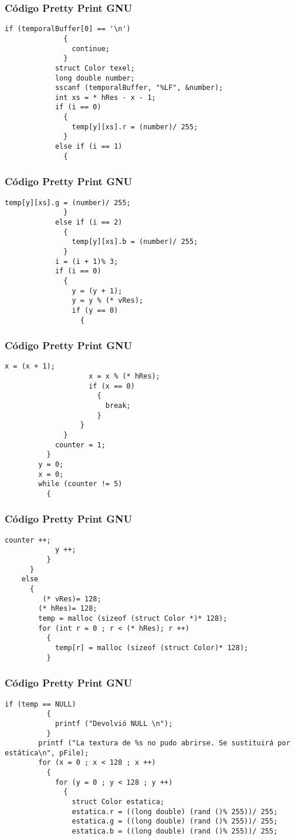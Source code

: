 \documentclass{beamer}
\begin{document}
\begin{frame}[fragile]
\frametitle{C\'odigo Pretty Print GNU}
\begin{lstlisting}[style=CStyle]
            if (temporalBuffer[0] == '\n')
              {
                continue;
              }
            struct Color texel;
            long double number;
            sscanf (temporalBuffer, "%LF", &number);
            int xs = * hRes - x - 1;
            if (i == 0)
              {
                temp[y][xs].r = (number)/ 255;
              }
            else if (i == 1)
              {
                \end{lstlisting}
\end{frame}
\begin{frame}[fragile]
\frametitle{C\'odigo Pretty Print GNU}
\begin{lstlisting}[style=CStyle]
                temp[y][xs].g = (number)/ 255;
              }
            else if (i == 2)
              {
                temp[y][xs].b = (number)/ 255;
              }
            i = (i + 1)% 3;
            if (i == 0)
              {
                y = (y + 1);
                y = y % (* vRes);
                if (y == 0)
                  {
                    \end{lstlisting}
\end{frame}
\begin{frame}[fragile]
\frametitle{C\'odigo Pretty Print GNU}
\begin{lstlisting}[style=CStyle]
                    x = (x + 1);
                    x = x % (* hRes);
                    if (x == 0)
                      {
                        break;
                      }
                  }
              }
            counter = 1;
          }
        y = 0;
        x = 0;
        while (counter != 5)
          {
            \end{lstlisting}
\end{frame}
\begin{frame}[fragile]
\frametitle{C\'odigo Pretty Print GNU}
\begin{lstlisting}[style=CStyle]
            counter ++;
            y ++;
          }
      }
    else
      {
         (* vRes)= 128;
        (* hRes)= 128;
        temp = malloc (sizeof (struct Color *)* 128);
        for (int r = 0 ; r < (* hRes); r ++)
          {
            temp[r] = malloc (sizeof (struct Color)* 128);
          }
\end{lstlisting}
\end{frame}
\begin{frame}[fragile]
\frametitle{C\'odigo Pretty Print GNU}
\begin{lstlisting}[style=CStyle]
        if (temp == NULL)
          {
            printf ("Devolvió NULL \n");
          }
        printf ("La textura de %s no pudo abrirse. Se sustituirá por estática\n", pFile);
        for (x = 0 ; x < 128 ; x ++)
          {
            for (y = 0 ; y < 128 ; y ++)
              {
                struct Color estatica;
                estatica.r = ((long double) (rand ()% 255))/ 255;
                estatica.g = ((long double) (rand ()% 255))/ 255;
                estatica.b = ((long double) (rand ()% 255))/ 255;
\end{lstlisting}
\end{frame}
\end{document}
